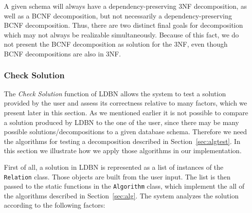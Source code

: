 A given schema will always have a dependency-preserving 3NF
decomposition, as well as a BCNF decomposition, but not necessarily a
dependency-preserving BCNF decomposition. Thus, there are two
distinct final goals for decomposition which may not always be
realizable simultaneously. Because of this fact, we do not present the BCNF decomposition as solution
for the 3NF, even though BCNF decompositions are also in 3NF.

\subsubsection{Check Solution}  
The \textit{Check Solution} function of LDBN allows the system to test a solution 
provided by the user and assess its correctness relative to many factors, which
we present later in this section. As we mentioned earlier it is not possible
to compare a solution produced by LDBN to the one of the user, since there may be many
possible solutions/decompositions to a given database schema. Therefore we need the
algorithms for testing a decomposition described in Section~\ref{sec:algtest}. In this section
we illustrate how we apply those algorithms in our implementation. 

First of all, a solution in LDBN is represented as a list of instances of the
\verb=Relation= class. Those objects are built from the user input. The list is then
passed to the static functions in the \verb=Algorithm= class, which 
implement the all of the algorithms described in Section~\ref{sec:alg}. 
The system analyzes the solution according to the following factors:

